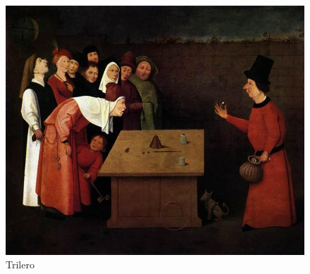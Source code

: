 \begin{figure}[h]
\begin{minipage}{.3\textwidth}
        \centering
        \includegraphics[width=\linewidth]{./imagenes/trilero.jpg}
        \caption{Trilero}
    \end{minipage}
\end{figure}

